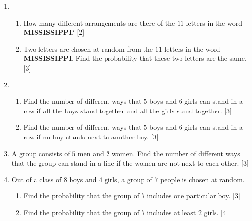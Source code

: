 \begin{enumerate}
\begin{enumerate}[resume,label=(\roman*)]
	\quad  \hfill	[3]
\end{enumerate}



\item  \begin{enumerate}[label=(\roman*)]
	\item How many different arrangements are there of the $11$ letters in the word \textbf{MISSISSIPPI}? \hfill[2]
	\item Two letters are chosen at random from the $11$ letters in the word \textbf{MISSISSIPPI}. Find the probability that these two letters are the same. \hfill[3]
\end{enumerate}




\item  \begin{enumerate}[label=(\roman*)]
	\item  Find the number of different ways that $5$ boys and $6$ girls can stand in a row if all the boys stand together and all the girls stand together. \hfill[3]
	\item Find the number of different ways that $5$ boys and $6$ girls can stand in a row if no boy stands next	to another boy. \hfill[3]
\end{enumerate} 



\item A group consists of $5$ men and $2$ women. Find the number of different ways that the group can stand in a line if the women are not next to each other. \hfill[3]


\item  Out of a class of $8$ boys and $4$ girls, a group of $7$ people is chosen at random.

\begin{enumerate}[label=(\roman*)]
	\item Find the probability that the group of $7$ includes one particular boy. \hfill[3]
	\item Find the probability that the group of $7$ includes at least $2$ girls. \hfill [4]
\end{enumerate}





\end{enumerate}
